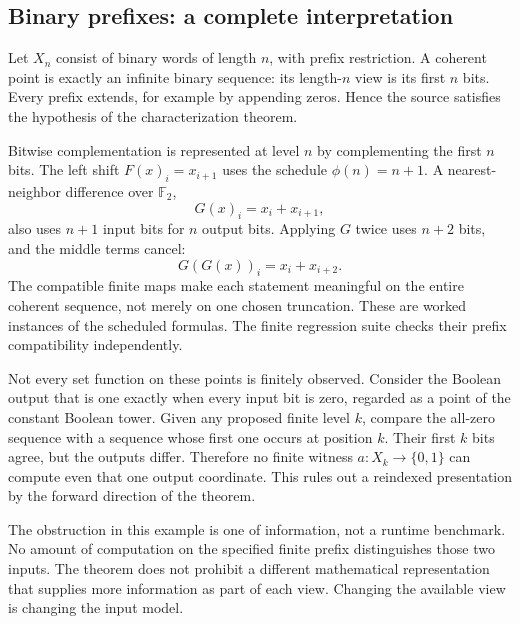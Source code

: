 
\subsection{Binary prefixes: a complete interpretation}
Let \(X_n\) consist of binary words of length \(n\), with prefix restriction. A coherent point is exactly an infinite binary sequence: its length-\(n\) view is its first \(n\) bits. Every prefix extends, for example by appending zeros. Hence the source satisfies the hypothesis of the characterization theorem.

Bitwise complementation is represented at level \(n\) by complementing the first \(n\) bits. The left shift \(F(x)_i=x_{i+1}\) uses the schedule \(\phi(n)=n+1\). A nearest-neighbor difference over \(\mathbb F_2\),
\[
 G(x)_i=x_i+x_{i+1},
\]
also uses \(n+1\) input bits for \(n\) output bits. Applying \(G\) twice uses \(n+2\) bits, and the middle terms cancel:
\[
 G(G(x))_i=x_i+x_{i+2}.
\]
The compatible finite maps make each statement meaningful on the entire coherent sequence, not merely on one chosen truncation. These are worked instances of the scheduled formulas. The finite regression suite checks their prefix compatibility independently.

Not every set function on these points is finitely observed. Consider the Boolean output that is one exactly when every input bit is zero, regarded as a point of the constant Boolean tower. Given any proposed finite level \(k\), compare the all-zero sequence with a sequence whose first one occurs at position \(k\). Their first \(k\) bits agree, but the outputs differ. Therefore no finite witness \(a:X_k\to\{0,1\}\) can compute even that one output coordinate. This rules out a reindexed presentation by the forward direction of the theorem.

The obstruction in this example is one of information, not a runtime benchmark. No amount of computation on the specified finite prefix distinguishes those two inputs. The theorem does not prohibit a different mathematical representation that supplies more information as part of each view. Changing the available view is changing the input model.

